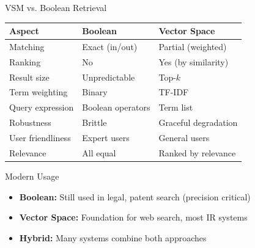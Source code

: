 \documentclass[aspectratio=169]{beamer}
\newif\ifanimated
\newcommand{\cpause}{\ifanimated\pause\fi}
\begin{document}
\begin{frame}[shrink=15]{VSM vs. Boolean Retrieval}
\begin{table}
\centering
\small
\begin{tabular}{lll}
\toprule
\textbf{Aspect} & \textbf{Boolean} & \textbf{Vector Space} \\
\midrule
Matching & Exact (in/out) & Partial (weighted) \\
Ranking & No & Yes (by similarity) \\
Result size & Unpredictable & Top-$k$ \\
Term weighting & Binary & TF-IDF \\
Query expression & Boolean operators & Term list \\
Robustness & Brittle & Graceful degradation \\
User friendliness & Expert users & General users \\
Relevance & All equal & Ranked by relevance \\
\bottomrule
\end{tabular}
\end{table}

\vspace{1em}

\begin{block}{Modern Usage}
\begin{itemize}
    \item \textbf{Boolean:} Still used in legal, patent search (precision critical)
    \item \textbf{Vector Space:} Foundation for web search, most IR systems
    \item \textbf{Hybrid:} Many systems combine both approaches
\end{itemize}
\cpause
\end{block}
\cpause
\end{frame}
\end{document}
